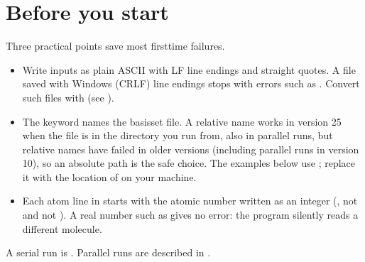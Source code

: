 \documentclass[letterpaper,10pt,english,openany,oneside]{sphinxmanual}
\begin{document}
\section{Before you start}
\label{\detokenize{start/getting-started:before-you-start}}
\sphinxAtStartPar
Three practical points save most first\sphinxhyphen{}time failures.
\begin{itemize}
\item {} 
\sphinxAtStartPar
{} Write inputs as plain ASCII with LF line endings and straight quotes. A file
saved with Windows (CRLF) line endings stops with errors such as . Convert such files with 
(see {\hyperref[\detokenize{start/running:running-input-files}]{}}).



\item {} 
\sphinxAtStartPar
{} The {\hyperref[\detokenize{reference/control:control-basis}]{}} keyword names the basis\sphinxhyphen{}set file.
A relative name works in version 25 when the file is in the directory you run from, also in parallel runs, but
relative names have failed in older versions (including parallel runs in version 10), so an absolute path is the
safe choice. The examples below use
; replace it with the location of  on your machine.



\item {} 
\sphinxAtStartPar
{} Each atom line in  starts with the atomic number written as an integer
(, not  and not ). A real number such as  gives no error: the program silently reads a different
molecule. 

\end{itemize}

\sphinxAtStartPar
A serial run is . Parallel runs are described in {\hyperref[\detokenize{start/running::doc}]{}}.
\end{document}
